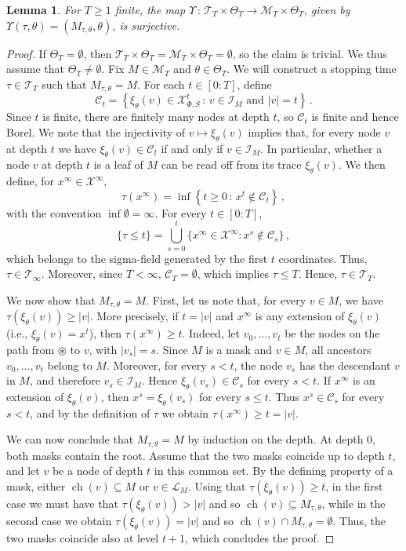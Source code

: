 \documentclass[10pt, a4paper]{article}
\newcommand{\Ell}{\mathcal L}
\newcommand{\I}{\mathcal I}
\newcommand{\ROOT}{\circledast}
\newcommand{\T}{\mathcal T}
\newcommand{\X}{\mathcal X}
\newcommand{\XP}{\X_{\Phi,S}}
\DeclareMathOperator{\ch}{ch}
\newtheorem{lemma}{Lemma}
\begin{document}
\begin{lemma}\label{lemma:surj}
    For $T\geq 1$ finite, the map $\Upsilon\,:\,\T_T \times \Theta_T \to \mathcal{M}_T\times\Theta_T$, given by $\Upsilon(\tau, \theta) = (M_{\tau,\theta},\theta)$, is surjective.
\end{lemma}
\begin{proof} 
    If $\Theta_T=\emptyset$, then $\T_T \times \Theta_T = \mathcal{M}_T\times\Theta_T = \emptyset$, so the claim is trivial. We thus assume that $\Theta_T\neq\emptyset$. Fix  $M \in \mathcal{M}_T$ and  $\theta \in \Theta_T$. We will construct a stopping time $\tau \in \T_T$ such that $M_{\tau,\theta} = M$. For each $t \in [0:T]$, define
    $$ \mathcal{C}_t = \left\{ \xi_\theta(v) \in \XP^t \,:\, v \in\I_M \text{ and } |v|=t \right\} \,. $$
    Since $t$ is finite, there are finitely many nodes at depth $t$, so $\mathcal{C}_t$ is finite and hence Borel. We note that the injectivity of $v\mapsto \xi_\theta(v)$ implies that, for every node $v$ at depth $t$ we have $\xi_\theta(v)\in\mathcal C_t$ if and only if $v\in \I_M$.  In particular, whether a node $v$  at depth $t$ is a leaf of $M$ can be read off from its trace $\xi_\theta(v)$.  We then define, for $x^\infty \in \X^\infty$,
    $$ \tau(x^\infty) = \inf \left\{ t \geq 0 \,:\, x^t \notin \mathcal{C}_t \right\} \,, $$ with the convention $\inf\emptyset = \infty$. For every  $t \in [0:T]$,
    $$ \{\tau \leq t\} = \bigcup_{s=0}^t \{x^\infty \in \X^\infty : x^s \notin \mathcal{C}_s\}\,, $$
    which belongs to the sigma-field generated by the first $t$ coordinates. Thus, $\tau\in\T_\infty$. Moreover, 
    since $T<\infty$, $\mathcal{C}_T = \emptyset$, which implies  $\tau \leq T$. Hence, $\tau \in \T_T$. 

    We now show that $M_{\tau,\theta}=M$. First, let us note that, for every $v\in M$, we have $\tau(\xi_\theta(v))\geq |v|$. More precisely, if $t=|v|$ and $x^\infty$ is any extension of $\xi_\theta(v)$ (i.e., $\xi_\theta(v)=x^t$), then $\tau(x^\infty)\geq t$. Indeed, let $v_0,\dots,v_t$ be the nodes on the path from $\ROOT$ to $v$, with $|v_s|=s$. Since $M$ is a mask and $v\in M$, all ancestors $v_0,\dots,v_t$ belong to $M$. Moreover, for every $s<t$, the node $v_s$ has the descendant $v$ in $M$, and therefore $v_s\in\I_M$. Hence $\xi_\theta(v_s)\in\mathcal C_s$ for every $s<t$. If $x^\infty$ is an extension of $\xi_\theta(v)$, then $x^s=\xi_\theta(v_s)$ for every $s\leq t$. Thus $x^s\in\mathcal C_s$ for every $s<t$, and by the definition of $\tau$ we obtain $\tau(x^\infty)\geq t=|v|$.

    We can now conclude that $M_{\tau,\theta}=M$ by induction on the depth. At depth $0$, both masks contain the root. Assume that the two masks coincide up to depth $t$, and let $v$ be a node of depth $t$ in this common set. By the defining property of a mask, either $\ch(v)\subseteq M$ or $v\in\Ell_M$. Using that $\tau(\xi_\theta(v))\geq t$, in the first case we must have that $\tau(\xi_\theta(v))> |v|$ and so $\ch(v)\subseteq M_{\tau,\theta}$, while in the second case we obtain $\tau(\xi_\theta(v))=|v|$ and so $\ch(v)\cap M_{\tau,\theta} = \emptyset$. Thus, the two masks coincide also at level $t+1$, which concludes the proof.
\end{proof}
\end{document}
